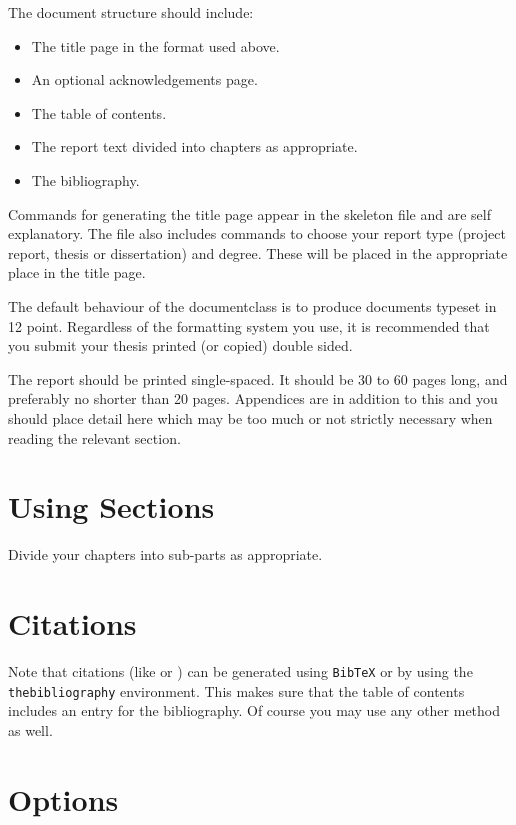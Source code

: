 \documentclass[bsc,frontabs,twoside,singlespacing,parskip,deptreport]{infthesis}     %
\begin{document}
The document structure should include:
\begin{itemize}
\item
The title page  in the format used above.
\item
An optional acknowledgements page.
\item
The table of contents.
\item
The report text divided into chapters as appropriate.
\item
The bibliography.
\end{itemize}

Commands for generating the title page appear in the skeleton file and
are self explanatory.
The file also includes commands to choose your report type (project
report, thesis or dissertation) and degree.
These will be placed in the appropriate place in the title page. 

The default behaviour of the documentclass is to produce documents typeset in
12 point.  Regardless of the formatting system you use, 
it is recommended that you submit your thesis printed (or copied) 
double sided.

The report should be printed single-spaced.
It should be 30 to 60 pages long, and preferably no shorter than 20 pages.
Appendices are in addition to this and you should place detail
here which may be too much or not strictly necessary when reading the relevant section.

\section{Using Sections}

Divide your chapters into sub-parts as appropriate.

\section{Citations}

Note that citations 
(like \cite{P1} or \cite{P2})
can be generated using {\tt BibTeX} or by using the
{\tt thebibliography} environment. This makes sure that the
table of contents includes an entry for the bibliography.
Of course you may use any other method as well.

\section{Options}
\end{document}
